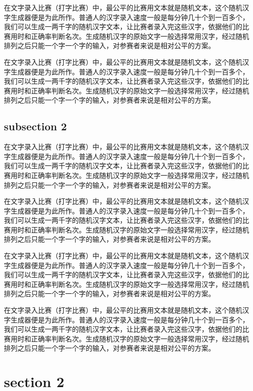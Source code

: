 \documentclass[12pt,hyperref,UTF8]{ctexbook}
\begin{document}
在文字录入比赛（打字比赛）中，最公平的比赛用文本就是随机文本，这个随机汉字生成器便是为此所作。普通人的汉字录入速度一般是每分钟几十个到一百多个，我们可以生成一两千字的随机汉字文本，让比赛者录入完这些汉字，依据他们的比赛用时和正确率判断名次。生成随机汉字的原始文字一般选择常用汉字，经过随机排列之后只能一个字一个字的输入，对参赛者来说是相对公平的方案。

在文字录入比赛（打字比赛）中，最公平的比赛用文本就是随机文本，这个随机汉字生成器便是为此所作。普通人的汉字录入速度一般是每分钟几十个到一百多个，我们可以生成一两千字的随机汉字文本，让比赛者录入完这些汉字，依据他们的比赛用时和正确率判断名次。生成随机汉字的原始文字一般选择常用汉字，经过随机排列之后只能一个字一个字的输入，对参赛者来说是相对公平的方案。

\subsection{subsection 2}

在文字录入比赛（打字比赛）中，最公平的比赛用文本就是随机文本，这个随机汉字生成器便是为此所作。普通人的汉字录入速度一般是每分钟几十个到一百多个，我们可以生成一两千字的随机汉字文本，让比赛者录入完这些汉字，依据他们的比赛用时和正确率判断名次。生成随机汉字的原始文字一般选择常用汉字，经过随机排列之后只能一个字一个字的输入，对参赛者来说是相对公平的方案。

在文字录入比赛（打字比赛）中，最公平的比赛用文本就是随机文本，这个随机汉字生成器便是为此所作。普通人的汉字录入速度一般是每分钟几十个到一百多个，我们可以生成一两千字的随机汉字文本，让比赛者录入完这些汉字，依据他们的比赛用时和正确率判断名次。生成随机汉字的原始文字一般选择常用汉字，经过随机排列之后只能一个字一个字的输入，对参赛者来说是相对公平的方案。

在文字录入比赛（打字比赛）中，最公平的比赛用文本就是随机文本，这个随机汉字生成器便是为此所作。普通人的汉字录入速度一般是每分钟几十个到一百多个，我们可以生成一两千字的随机汉字文本，让比赛者录入完这些汉字，依据他们的比赛用时和正确率判断名次。生成随机汉字的原始文字一般选择常用汉字，经过随机排列之后只能一个字一个字的输入，对参赛者来说是相对公平的方案。

在文字录入比赛（打字比赛）中，最公平的比赛用文本就是随机文本，这个随机汉字生成器便是为此所作。普通人的汉字录入速度一般是每分钟几十个到一百多个，我们可以生成一两千字的随机汉字文本，让比赛者录入完这些汉字，依据他们的比赛用时和正确率判断名次。生成随机汉字的原始文字一般选择常用汉字，经过随机排列之后只能一个字一个字的输入，对参赛者来说是相对公平的方案。

\section{section 2}
\end{document}
